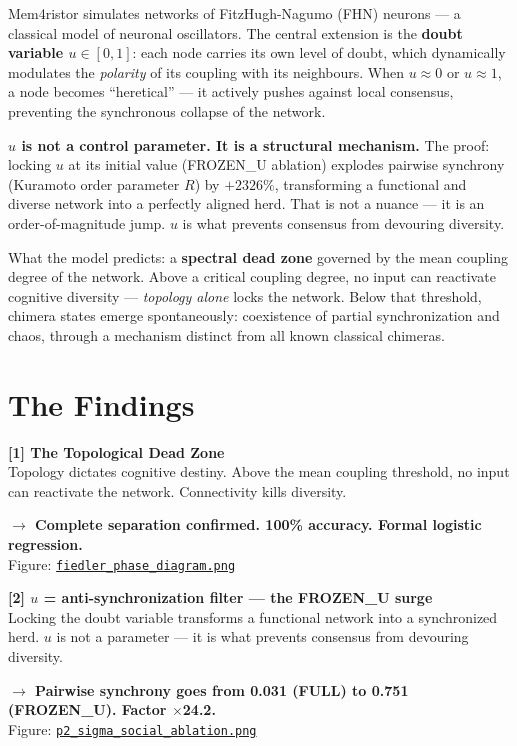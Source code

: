 \documentclass[11pt, a4paper]{article}
\newcommand{\result}[1]{\textbf{\color{positive}#1}}
\newcommand{\kw}[1]{\textbf{#1}}
\begin{document}
Mem4ristor simulates networks of FitzHugh-Nagumo (FHN) neurons --- a classical model of neuronal
oscillators. The central extension is the \kw{doubt variable $u \in [0,1]$}: each node carries its
own level of doubt, which dynamically modulates the \textit{polarity} of its coupling with its
neighbours. When $u \approx 0$ or $u \approx 1$, a node becomes ``heretical'' --- it actively
pushes against local consensus, preventing the synchronous collapse of the network.

\kw{$u$ is not a control parameter. It is a structural mechanism.} The proof: locking $u$ at its initial
value (FROZEN\_U ablation) explodes pairwise synchrony (Kuramoto order parameter $R$) by \result{$+2326\%$}, transforming a functional and
diverse network into a perfectly aligned herd. That is not a nuance --- it is an order-of-magnitude
jump. $u$ is what prevents consensus from devouring diversity.

What the model predicts: a \kw{spectral dead zone} governed by the mean coupling degree of the network. Above a critical coupling degree, no input can reactivate cognitive diversity --- \textit{topology alone} locks the network. Below that threshold, chimera states emerge spontaneously: coexistence of partial synchronization and chaos, through a mechanism distinct from all known classical chimeras.

\section{The Findings}

\begin{finding}
\textbf{[1] The Topological Dead Zone}\\
Topology dictates cognitive destiny. Above the mean coupling threshold, no input can reactivate the
network. Connectivity kills diversity.

\result{$\rightarrow$ Complete separation confirmed. 100\% accuracy. Formal logistic regression.}\\
Figure: \href{https://github.com/cafe-virtuel/Mem4ristor/blob/main/figures/fiedler_phase_diagram.png}{\texttt{fiedler\_phase\_diagram.png}}
\end{finding}

\vspace{0.5em}

\begin{finding}
\textbf{[2] $u$ = anti-synchronization filter --- the FROZEN\_U surge}\\
Locking the doubt variable transforms a functional network into a synchronized herd. $u$ is not a
parameter --- it is what prevents consensus from devouring diversity.

\result{$\rightarrow$ Pairwise synchrony goes from 0.031 (FULL) to 0.751 (FROZEN\_U). Factor $\times$24.2.}\\
Figure: \href{https://github.com/cafe-virtuel/Mem4ristor/blob/main/figures/p2_sigma_social_ablation.png}{\texttt{p2\_sigma\_social\_ablation.png}}
\end{finding}
\end{document}
